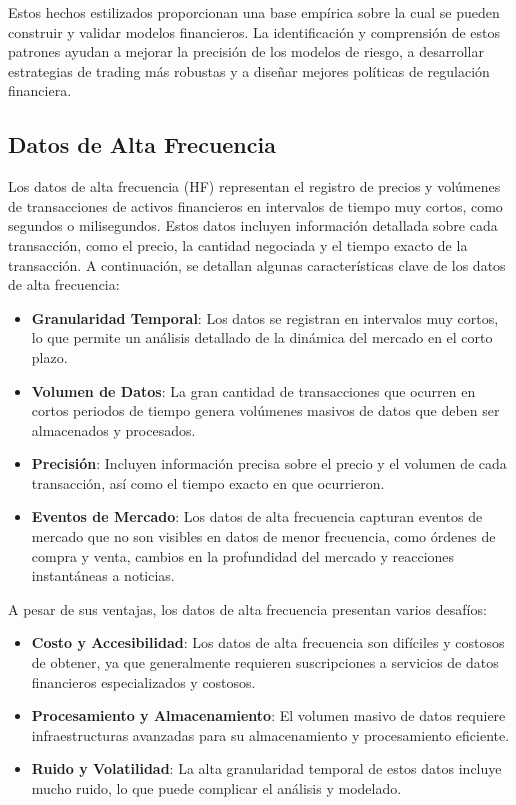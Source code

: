 \documentclass[a4paper,12pt, twoside]{report}
\begin{document}
Estos hechos estilizados proporcionan una base empírica sobre la cual se pueden construir y validar modelos financieros. La identificación 
y comprensión de estos patrones ayudan a mejorar la precisión de los modelos de riesgo, a desarrollar estrategias de trading más robustas 
y a diseñar mejores políticas de regulación financiera.


\subsection{Datos de Alta Frecuencia}

Los datos de alta frecuencia (HF) representan el registro de precios y volúmenes de transacciones de activos financieros en intervalos 
de tiempo muy cortos, como segundos o milisegundos. Estos datos incluyen información detallada sobre cada transacción, como el precio, 
la cantidad negociada y el tiempo exacto de la transacción. A continuación, se detallan algunas características clave de los datos de 
alta frecuencia:

\begin{itemize}
    \item \textbf{Granularidad Temporal}: Los datos se registran en intervalos muy cortos, lo que permite un análisis detallado de la 
    dinámica del mercado en el corto plazo.
    \item \textbf{Volumen de Datos}: La gran cantidad de transacciones que ocurren en cortos periodos de tiempo genera volúmenes 
    masivos de datos que deben ser almacenados y procesados.
    \item \textbf{Precisión}: Incluyen información precisa sobre el precio y el volumen de cada transacción, así como el tiempo exacto 
    en que ocurrieron.
    \item \textbf{Eventos de Mercado}: Los datos de alta frecuencia capturan eventos de mercado que no son visibles en datos de menor 
    frecuencia, como órdenes de compra y venta, cambios en la profundidad del mercado y reacciones instantáneas a noticias.
\end{itemize}

A pesar de sus ventajas, los datos de alta frecuencia presentan varios desafíos:

\begin{itemize}
    \item \textbf{Costo y Accesibilidad}: Los datos de alta frecuencia son difíciles y costosos de obtener, ya que generalmente requieren 
    suscripciones a servicios de datos financieros especializados y costosos.
    \item \textbf{Procesamiento y Almacenamiento}: El volumen masivo de datos requiere infraestructuras avanzadas para su almacenamiento 
    y procesamiento eficiente.
    \item \textbf{Ruido y Volatilidad}: La alta granularidad temporal de estos datos incluye mucho ruido, lo que puede complicar el 
    análisis y modelado.
\end{itemize}
\end{document}

